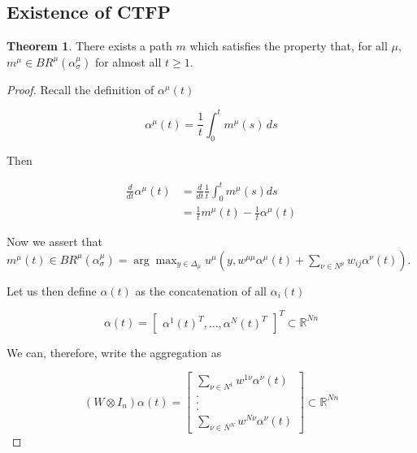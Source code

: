 \documentclass{article}
\theoremstyle{definition}
\newtheorem{theorem}{Theorem}
\begin{document}
	\subsection{Existence of CTFP}

	\begin{theorem}
		There exists a path $m$ which satisfies the property that, for all $\mu$, $m^\mu \in
		BR^\mu(\alpha_\sigma^\mu)$ for almost all $t \geq 1$.
	\end{theorem}

	\begin{proof}
		Recall the definition of $\alpha^\mu(t)$

		\begin{equation*}
		\alpha^\mu(t) = \frac{1}{t} \int_{0}^{t} m^\mu(s) \, ds
		\end{equation*}

		Then 

		\begin{align}
		\frac{d}{dt} \alpha^\mu(t) & = \frac{d}{dt} \frac{1}{t} \int_{0}^t m^\mu(s) ds \nonumber \\
		& = \frac{1}{t} m^\mu(t) - \frac{1}{t} \alpha^\mu(t)
		\end{align}

		Now we assert that $m^\mu(t) \in BR^\mu(\alpha_{\sigma}^\mu) = \arg\max_{y \in \Delta_\mu} u^\mu(y,
		w^{\mu \mu} \alpha^\mu(t) + \sum_{\nu \in N^\mu} w_{ij} \alpha^\nu(t))$. 

		Let us then define $\alpha(t)$ as the concatenation of all $\alpha_i(t)$

		\begin{equation}
			\alpha(t) = \begin{bmatrix}
				\alpha^1(t)^T, \ldots, \alpha^N(t)^T
			\end{bmatrix}^T \subset \mathbb{R}^{Nn}
		\end{equation}


		We can, therefore, write the aggregation as

		\begin{equation}
			(W \otimes I_n) \alpha(t) = \begin{bmatrix}
				\sum_{\nu \in N^1} w^{1 \nu} \alpha^\nu(t) \\
				.\\
				.\\
				.\\
				\sum_{\nu \in N^N} w^{N \nu} \alpha^\nu(t)
			\end{bmatrix} \subset \mathbb{R}^{Nn}
		\end{equation}


\end{proof}
\end{document}
